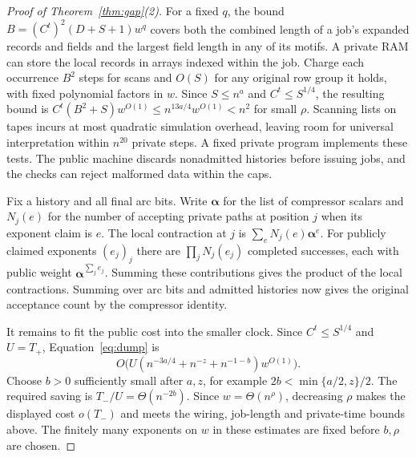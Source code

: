 \begin{proof}[Proof of Theorem~\ref{thm:gap}(2)]
For a fixed $q$, the bound $B=(C^t)^2(D+S+1)w^q$ covers both the
combined length of a job's expanded records and fields and the
largest field length in any of its motifs. A private RAM can store
the local records in arrays indexed within the job. Charge each occurrence
$B^2$ steps for scans and $O(S)$ for any original row group it holds,
with fixed polynomial factors in $w$. Since $S\le n^a$ and
$C^t\le S^{1/4}$, the resulting bound is
$C^t(B^2+S)w^{O(1)}\le n^{13a/4}w^{O(1)}<n^2$ for small $\rho$. Scanning lists
on tapes incurs at most quadratic simulation overhead, leaving room
for universal interpretation within $n^{20}$ private steps. A fixed
private program implements these tests. The public machine discards
nonadmitted histories before issuing jobs, and the checks can reject
malformed data within the caps.

Fix a history and all final arc bits. Write $\boldsymbol\alpha$ for
the list of compressor scalars and $N_j(e)$ for the number of accepting
private paths at position $j$ when its exponent claim is $e$. The
local contraction at $j$ is $\sum_e N_j(e)\boldsymbol\alpha^e$.
For publicly claimed exponents $(e_j)_j$ there are
$\prod_j N_j(e_j)$ completed successes, each with public weight
$\boldsymbol\alpha^{\sum_j e_j}$. Summing these contributions gives
the product of the local contractions. Summing over arc bits and
admitted histories now gives the original acceptance count by the
compressor identity.

It remains to fit the public cost into the smaller clock.
Since $C^t\le S^{1/4}$ and $U=T_+$, Equation~\eqref{eq:dump} is
\[
             O\bigl(U(n^{-3a/4}+n^{-z}+n^{-1-b})w^{O(1)}\bigr).
\]
Choose $b>0$ sufficiently small after $a,z$, for example
$2b<\min\{a/2,z\}/2$. The required saving is
$T_-/U=\Theta(n^{-2b})$. Since $w=\Theta(n^\rho)$, decreasing $\rho$
makes the displayed cost $o(T_-)$ and meets the wiring, job-length
and private-time bounds above. The finitely many exponents on $w$
in these estimates are fixed before $b,\rho$ are chosen.
\end{proof}
